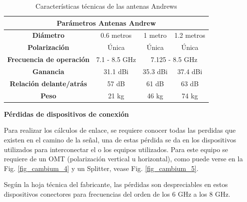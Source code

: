 \documentclass[12pt,a4paper]{book}
\begin{document}
\medskip
\begin{table}[H]
\begin{center}
\begin{tabular}{|c|c|c|c|}
\hline
\multicolumn{4}{|c|}{\textbf{Parámetros Antenas Andrew}} \\
\hline
\textbf{Diámetro} & 0.6 metros & 1 metro & 1.2 metros \\
\hline
\textbf{Polarización} & Única & Única & Única \\
\hline
\textbf{Frecuencia de operación} & 7.1 - 8.5 GHz & \multicolumn{2}{|c|}{7.125 - 8.5 GHz} \\
\hline
\textbf{Ganancia} & 31.1 dBi & 35.3 dBi & 37.4 dBi \\
\hline
\textbf{Relación delante/atrás} & 57 dB & 61 dB & 63 dB \\
\hline
\textbf{Peso} & 21 kg & 46 kg & 74 kg \\
\hline
\end{tabular}
\label{tab_caracteristicas_antenas_andrews}
\caption{Características técnicas de las antenas Andrews}
\end{center}
\end{table}


\noindent\textbf{Pérdidas de dispositivos de conexión}

Para realizar los cálculos de enlace, se requiere conocer todas las perdidas que existen en el camino de la señal, una de estas pérdida se da en los dispositivos utilizados para interconectar el o los equipos utilizados. Para este equipo se requiere de un OMT (polarización vertical u horizontal), como puede verse en la Fig. \ref{fig_cambium_4} y un Splitter, vease Fig. \ref{fig_cambium_5}.

Según la hoja técnica del fabricante, las pérdidas son despreciables en estos dispositivos conectores para frecuencias del orden de los 6 GHz a los 8 GHz.
\end{document}
